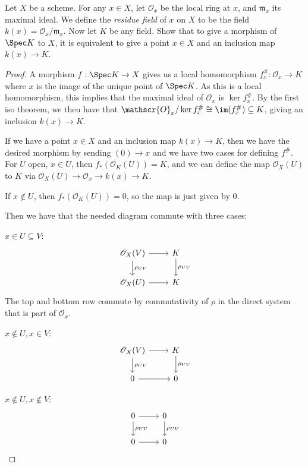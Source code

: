 \begin{exercise}%
	Let $X $ be a scheme. For any $x\in X $, let $\mathscr{O}_x $ be the local ring at $x $, and $\mathfrak{m}_x $ its maximal ideal. We define the \textit{residue field} of $x $ on $X $ to be the field $k(x) = \mathscr{O}_x / \mathfrak{m}_x $. Now let $K $ be any field. Show that to give a morphism of $\Spec K $ to $X $, it is equivalent to give a point $x\in X $ and an inclusion map $k(x) \to K $.
\end{exercise}
\begin{proof}
	A morphism $f: \Spec K \to X $ gives us a local homomorphism $f^\#_x: \mathscr{O}_x \to K $ where $x $ is the image of the unique point of $\Spec K $.
	As this is a local homomorphism, this implies that the maximal ideal of $\mathscr{O}_x $ is $\ker f^\#_x$.
	By the first iso theorem, we then have that $\mathscr{O}_x / \ker f^\#_x \cong \im(f^\#_x) \subseteq K $, giving an inclusion $k(x) \to K $.

	If we have a point $x\in X $ and an inclusion map $k(x) \to K $, then we have the desired morphism by sending $(0) \to x $ and we have two cases for defining $f^\# $.
	For $U $ open, $x\in U $, then $f_\ast(\mathscr{O}_K(U)) = K $, and we can define the map $\mathscr{O}_X(U) $ to $K $ via $\mathscr{O}_X(U) \to \mathscr{O}_x \to k(x) \to K $.

	If $x\notin U $, then $f_\ast(\mathscr{O}_K(U)) = 0 $, so the map is just given by 0.

	Then we have that the needed diagram commute with three cases:

	$x\in U \subseteq V$:
	\[
	\begin{tikzcd}
	{\mathscr{O}_X(V)} & K\\
	{\mathscr{O}_X(U)} & K
	\arrow[from=1-1,to=1-2]
	\arrow["\rho_{UV}",from=1-1,to=2-1]
	\arrow[from=2-1,to=2-2]
	\arrow["\rho _{UV}",from=1-2,to=2-2]
	\end{tikzcd}
	\]
	The top and bottom row commute by commutativity of $\rho $ in the direct system that is part of $\mathscr{O}_x $.

	$x\notin U, x \in V $:
	\[
	\begin{tikzcd}
	\mathscr{O}_X(V) & K\\
	0 & 0
	\arrow[from=1-1,to=1-2]
	\arrow["\rho_{UV}",from=1-1,to=2-1]
	\arrow[from=2-1,to=2-2]
	\arrow["\rho _{UV}",from=1-2,to=2-2]
	\end{tikzcd}
	\]

	$x\notin U, x \notin V $:
	\[
	\begin{tikzcd}
	0 & 0\\
	0 & 0
	\arrow[from=1-1,to=1-2]
	\arrow["\rho_{UV}",from=1-1,to=2-1]
	\arrow[from=2-1,to=2-2]
	\arrow["\rho _{UV}",from=1-2,to=2-2]
	\end{tikzcd}
	\]
\end{proof}

